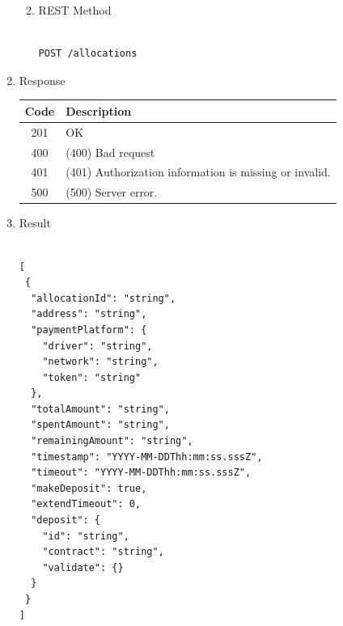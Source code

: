 \begin{enumerate}
\begin{enumerate}
\begin{table}[H]
\begin{center}
\begin{tabular}{|p{3cm}|l|p{3cm}|p{3cm}|p{4cm}|}
\end{tabular}
\end{center}
\end{table}

\item REST Method

\begin{tcolorbox}[boxrule=0pt, frame empty]
\begin{verbatim} 

POST /allocations

\end{verbatim}
\end{tcolorbox}

\end{enumerate}

\item Response

\begin{table}[H]
\footnotesize

\begin{center}
\begin{tabular}{|c|l|} 
\hline
\rowcolor{lightgray}	Code 		& 	Description \\
\hline
201	 		&	OK \\
\hline
400			&	(400) Bad request \\
\hline
401			&	(401) Authorization information is missing or invalid. \\
\hline
500			&	(500) Server error. \\
\hline
\end{tabular}
\end{center}

\end{table}

\item Result

\begin{tcolorbox}[boxrule=0pt, frame empty]
\begin{verbatim}

[
 {
  "allocationId": "string",
  "address": "string",
  "paymentPlatform": {
    "driver": "string",
    "network": "string",
    "token": "string"
  },
  "totalAmount": "string",
  "spentAmount": "string",
  "remainingAmount": "string",
  "timestamp": "YYYY-MM-DDThh:mm:ss.sssZ",
  "timeout": "YYYY-MM-DDThh:mm:ss.sssZ",
  "makeDeposit": true,
  "extendTimeout": 0,
  "deposit": {
    "id": "string",
    "contract": "string",
    "validate": {}
  }
 }
]

\end{verbatim}
\end{tcolorbox}


\end{enumerate}
